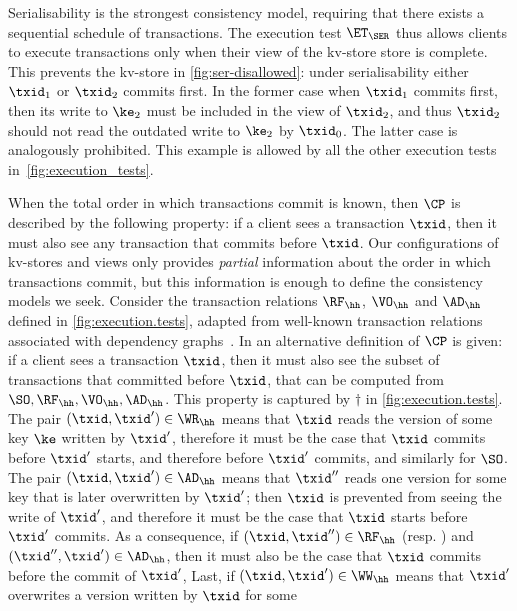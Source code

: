 Serialisability is the strongest consistency model, requiring that there exists a sequential schedule of transactions. 
The execution test $\ET_{\SER}$ thus allows clients to execute transactions only when 
their view of the kv-store store is complete.
This prevents the kv-store in  \cref{fig:ser-disallowed}: under serialisability either $\txid_1$ or $\txid_2$ commits first.
In the former case when $\txid_1$ commits first, then its write to $\ke_2$ must be included in the view of $\txid_2$, and thus $\txid_2$ should not read the outdated write to $\ke_2$ by $\txid_0$. 
The latter case is analogously prohibited. 
This example is allowed by all the other execution tests in~\cref{fig:execution_tests}.

\label{para:cp}
When the total order in which transactions commit is known, then 
$\CP$ is described by the following property: 
if a client sees a transaction $\txid$,
then it must also see any transaction that commits before $\txid$. 
Our configurations of kv-stores and views only provides {\em
  partial} information about the order in which transactions commit,
but this information is enough to define the consistency models we
seek. 
Consider the transaction relations $\RF_{\hh}$, $\VO_{\hh}$ and
$\AD_{\hh}$ defined in \ref{fig:execution.tests}, adapted from well-known
transaction relations associated with dependency graphs~\cite{adya-icde,adya}.
In \cite{laws} an alternative definition of $\CP$ is given: if a client sees a transaction $\txid$, 
then it must also see the subset of transactions that committed before $\txid$, that can 
be computed from $\SO, \RF_{\hh}, \VO_{\hh}, \AD_{\hh}$. This property is captured 
by $\dagger$ in \cref{fig:execution.tests}.
The pair $(\txid,\txid') \in \WR_\hh$ means that $\txid$ reads the version of some key $\ke$ 
written by $\txid'$, therefore  it {must} be
the case that $\txid$ commits before $\txid'$ starts, and therefore before $\txid'$ commits,
and similarly for $\SO$.
The pair $(\txid, \txid') \in \AD_{\hh}$ means that $\txid''$ reads one version for some key that 
is later overwritten by $\txid'$; then $\txid$ is prevented from seeing the write of $\txid'$, 
and therefore it {must} be the case that $\txid$ starts before 
$\txid'$ commits. 
As a consequence, if 
$(\txid,\txid'') \in \RF_{\hh}$ (resp. \SO) and $(\txid'',\txid') \in \AD_\hh$, then it {must} also be the case that $\txid$ commits before the commit  of $\txid'$, 
Last, if $(\txid,\txid') \in \WW_\hh$ means that $\txid'$ overwrites a version written by $\txid$ for some 
